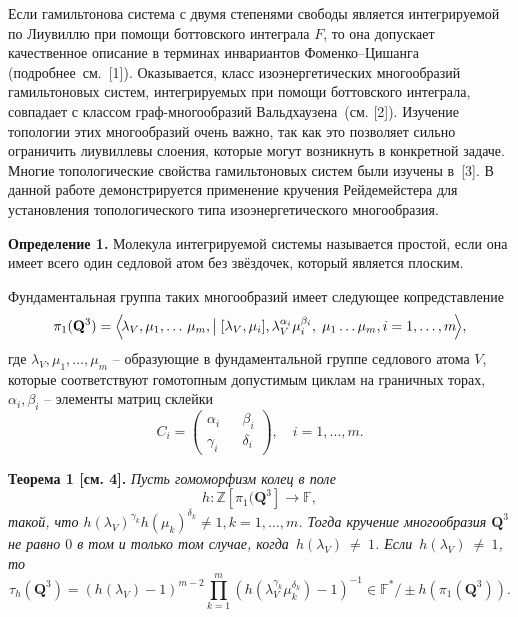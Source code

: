 


\vzmscaption

Если гамильтонова система с двумя степенями свободы является интегрируемой по Лиувиллю
при помощи боттовского интеграла $F$,
то она допускает качественное описание в терминах инвариантов Фоменко--Цишанга (подробнее~см.~[1]).
Оказывается, класс изоэнергетических многообразий гамильтоновых систем,
интегрируемых при помощи боттовского интеграла,
совпадает с классом граф-многообразий Вальдхаузена~(см. [2]).
Изучение топологии этих многообразий очень важно, так как это позволяет сильно ограничить лиувиллевы слоения,
которые могут возникнуть в конкретной задаче.
Многие топологические свойства гамильтоновых систем были изучены в~[3].
В данной работе демонстрируется  применение кручения Рейдемейстера
для установления топологического типа изоэнергетического многообразия.

\textbf{Определение 1.}
Молекула интегрируемой системы называется простой,
если она имеет всего один седловой атом без звёздочек, который является плоским.

Фундаментальная группа таких многообразий имеет следующее копредставление
$$
\pi_1(\mathbf{Q}^3) = \left\langle\!\lambda_V, \mu_1, \dots\, \mu_{m}, \bigm|  [\lambda_V, \mu_i], \lambda_V^{\alpha_i}\mu_i^{\beta_i} ,\;\mu_1\dots\mu_m,\\ i = 1,\dots, m\!\right\rangle\!,
$$
где $\lambda_V, \mu_1, \dots, \mu_m$ -- образующие в фундаментальной группе седлового атома $V$,
которые соответствуют гомотопным допустимым циклам на граничных торах,
$\alpha_i, \beta_i$ -- элементы матриц склейки
$$
C_i = \begin{pmatrix} \alpha_i && \beta_i \\ \gamma_i && \delta_i \end{pmatrix},\quad i = 1,\dots, m.
$$

\textbf{Теорема 1 [см. 4].} {\it Пусть гомоморфизм колец в поле
$$
h \colon \mathbb{Z}[\pi_1(\mathbf{Q}^3] \rightarrow \mathbb{F},
$$
такой, что $h(\lambda_V)^{\gamma_k}h(\mu_k)^{\delta_k} \ne 1, k = 1,\dots, m$.
Тогда кручение многообразия $\mathbf{Q}^3$ не равно $0$ в том и только том случае,
когда~$h(\lambda_V)~\ne~1$.
Если~$h(\lambda_V)~\ne~1$, то
$$
\tau_h(\mathbf{Q}^3) = (h(\lambda_V) - 1)^{m-2}{\underset{k=1}{\overset{m}{\prod}}(h(\lambda^{\gamma_k}_V\mu^{\delta_k}_k) - 1)^{-1}} \in \mathbb{F}^*/\pm h(\pi_1(\mathbf{Q}^3)).
$$}

